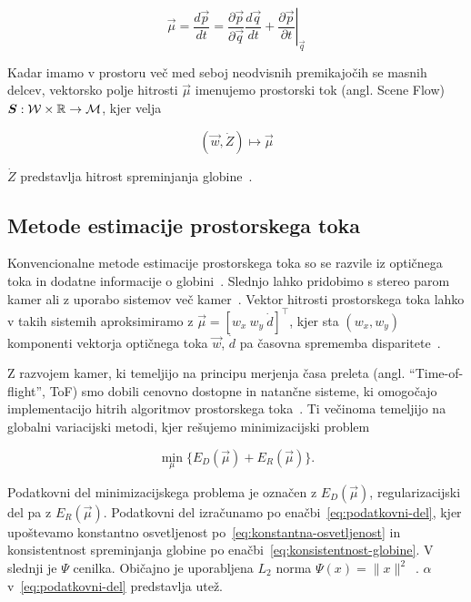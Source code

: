 \begin{equation}\label{eq:scene-flow}
	\vec{\mu} = \frac{d\vec{p}}{dt} = \frac{\partial \vec{p}}{\partial \vec{q}} \frac{d\vec{q}}{dt} + \left.\frac{\partial \vec{p}}{\partial t}\right|_{\vec{q}}
\end{equation}

Kadar imamo v prostoru več med seboj neodvisnih premikajočih se masnih delcev, vektorsko polje hitrosti $\vec{\mu}$ imenujemo prostorski tok (angl. Scene Flow) ${\boldsymbol{S}}: \mathcal{W} \times \mathbb{R} \to \mathcal{M}$, kjer velja

\begin{equation}
(\vec{w}, \dot{Z}) \mapsto \vec{\mu}
\label{eq:of-sf}
\end{equation}



$\dot{Z}$ predstavlja hitrost spreminjanja globine~\cite{yan2016scene}.

\subsection{Metode estimacije prostorskega toka}
Konvencionalne metode estimacije prostorskega toka so se razvile iz optičnega toka in dodatne informacije o globini~\cite{yan2016scene}. Slednjo lahko pridobimo s stereo parom kamer ali z uporabo sistemov več kamer~\cite{jaimez2015primal}. Vektor hitrosti prostorskega toka lahko v takih sistemih aproksimiramo z $\vec{\mu} = \left[w_x~w_y~\dot{d}\right]^\top$, kjer sta $(w_x, w_y)$ komponenti vektorja optičnega toka $\vec{w}$, $\dot{d}$ pa časovna sprememba disparitete~\cite{yan2016scene}.

Z razvojem kamer, ki temeljijo na principu merjenja časa preleta (angl. ``Time-of-flight'', ToF) smo dobili cenovno dostopne in natančne sisteme, ki omogočajo implementacijo hitrih algoritmov prostorskega toka~\cite{yan2016scene,jaimez2015primal}. Ti večinoma temeljijo na globalni variacijski metodi, kjer rešujemo minimizacijski problem 

\begin{equation}\label{eq:minimizacijski-problem}
	\min_{\mu}\{E_D(\vec{\mu}) + E_R(\vec{\mu})\}.
\end{equation}

Podatkovni del minimizacijskega problema je označen z $E_D(\vec{\mu})$, regularizacijski del pa z  $E_R(\vec{\mu})$. Podatkovni del izračunamo po enačbi~\eqref{eq:podatkovni-del}, kjer upoštevamo konstantno osvetljenost po~\eqref{eq:konstantna-osvetljenost} in konsistentnost spreminjanja globine po enačbi~\eqref{eq:konsistentnost-globine}. V slednji je  $\Psi$ cenilka. Običajno je uporabljena $L_2$ norma $\Psi(x) = \| x \|^2$~\cite{yan2016scene}. $\alpha$ v~\eqref{eq:podatkovni-del} predstavlja utež.


